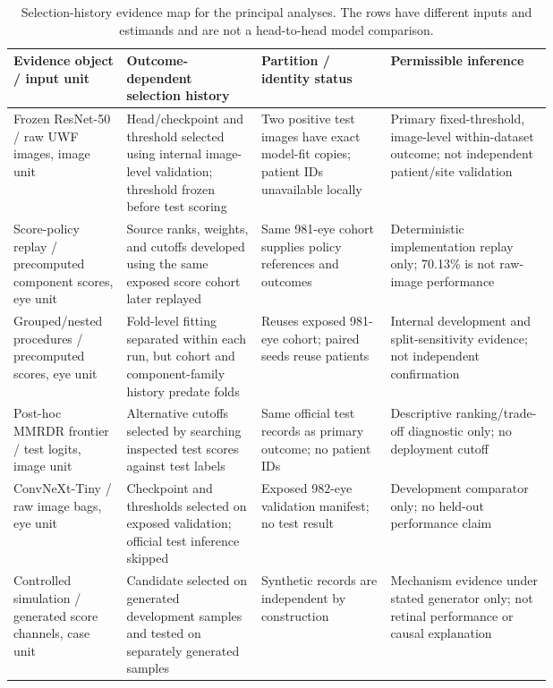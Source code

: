\documentclass[11pt]{article}
\begin{document}
\begin{table}[t]
\centering
\caption{Selection-history evidence map for the principal analyses. The rows have different inputs and estimands and are not a head-to-head model comparison.}
\label{tab:replay-model}
\footnotesize
\setlength{\tabcolsep}{3pt}
\begin{tabularx}{\linewidth}{>{\raggedright\arraybackslash}p{0.21\linewidth}>{\raggedright\arraybackslash}p{0.25\linewidth}>{\raggedright\arraybackslash}p{0.24\linewidth}X}
\toprule
Evidence object / input unit & Outcome-dependent selection history & Partition / identity status & Permissible inference \\
\midrule
Frozen ResNet-50 / raw UWF images, image unit & Head/checkpoint and threshold selected using internal image-level validation; threshold frozen before test scoring & Two positive test images have exact model-fit copies; patient IDs unavailable locally & Primary fixed-threshold, image-level within-dataset outcome; not independent patient/site validation \\
Score-policy replay / precomputed component scores, eye unit & Source ranks, weights, and cutoffs developed using the same exposed score cohort later replayed & Same 981-eye cohort supplies policy references and outcomes & Deterministic implementation replay only; 70.13\% is not raw-image performance \\
Grouped/nested procedures / precomputed scores, eye unit & Fold-level fitting separated within each run, but cohort and component-family history predate folds & Reuses exposed 981-eye cohort; paired seeds reuse patients & Internal development and split-sensitivity evidence; not independent confirmation \\
Post-hoc MMRDR frontier / test logits, image unit & Alternative cutoffs selected by searching inspected test scores against test labels & Same official test records as primary outcome; no patient IDs & Descriptive ranking/trade-off diagnostic only; no deployment cutoff \\
ConvNeXt-Tiny / raw image bags, eye unit & Checkpoint and thresholds selected on exposed validation; official test inference skipped & Exposed 982-eye validation manifest; no test result & Development comparator only; no held-out performance claim \\
Controlled simulation / generated score channels, case unit & Candidate selected on generated development samples and tested on separately generated samples & Synthetic records are independent by construction & Mechanism evidence under stated generator only; not retinal performance or causal explanation \\
\bottomrule
\end{tabularx}
\end{table}
\end{document}
